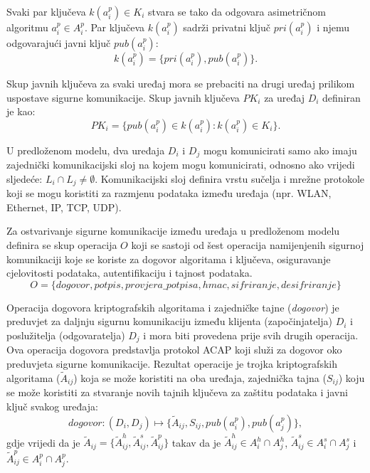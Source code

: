 Svaki par ključeva $k(a^p_i)\in K_i$ stvara se tako da odgovara asimetričnom
algoritmu $a^p_i\in A^p_i$. Par ključeva $k(a^p_i)$ 
sadrži privatni ključ $pri(a^p_i)$
i njemu odgovarajući javni ključ $pub(a^p_i)$:
\begin{equation}
    k(a^p_i)=\{pri(a^p_i), pub(a^p_i)\}.
\end{equation}

Skup javnih ključeva za svaki uređaj mora se prebaciti na drugi uređaj prilikom
uspostave sigurne komunikacije.
Skup javnih ključeva $PK_i$ za uređaj $D_i$ definiran je kao: 
\begin{equation}
PK_i=\{pub(a^p_i)\in k(a^p_i):k(a^p_i)\in K_i\}.
\end{equation}

U predloženom modelu, dva uređaja $D_i$ i $D_j$ mogu komunicirati samo
ako imaju zajednički komunikacijski sloj na kojem mogu komunicirati, odnosno ako
vrijedi sljedeće: $L_i \cap L_j \neq \emptyset$.
Komunikacijski sloj definira vrstu sučelja i mrežne protokole koji se mogu
koristiti za razmjenu podataka između uređaja (npr. WLAN, Ethernet, IP, TCP,
UDP). 


Za ostvarivanje sigurne komunikacije između uređaja u predloženom modelu
definira se skup operacija $O$ koji se sastoji od šest operacija namijenjenih
sigurnoj komunikaciji koje se koriste za dogovor algoritama i ključeva,
osiguravanje cjelovitosti podataka, autentifikaciju i tajnost podataka.
\begin{equation}
    O=\{dogovor, \mathit{potpis}, \mathit{provjera\_potpisa}, hmac, \mathit{sifriranje}, \mathit{desifriranje}\}
\end{equation}

Operacija dogovora kriptografskih algoritama i zajedničke tajne
(\textit{dogovor}) je preduvjet za daljnju sigurnu komunikaciju između
klijenta (započinjatelja) $D_i$ i poslužitelja (odgovaratelja) $D_j$ i mora biti
provedena prije svih drugih
operacija. Ova operacija dogovora predstavlja protokol ACAP koji služi za
dogovor oko preduvjeta sigurne komunikacije. Rezultat operacije je trojka
kriptografskih algoritama ($\widetilde{A}_{ij}$) koja se može koristiti na oba
uređaja, zajednička tajna ($S_{ij}$) koju se može koristiti za stvaranje novih
tajnih ključeva za zaštitu podataka i javni ključ svakog uređaja:
\begin{equation}
	dogovor:(D_i,D_j)\longmapsto\{\widetilde{A}_{ij},S_{ij},pub(a^p_i),pub(a^p_j)\},
	\label{eq:agreement}
\end{equation}
gdje vrijedi da je
$\widetilde{A}_{ij}=\{\widetilde{A}^h_{ij},\widetilde{A}^s_{ij},\widetilde{A}^p_{ij}\}$
takav da je $\widetilde{A}^h_{ij}\in A^h_{i}\cap A^h_{j}$,
$\widetilde{A}^s_{ij}\in A^s_{i}\cap A^s_{j}$ i $\widetilde{A}^p_{ij}\in
A^p_{i}\cap A^p_{j}$. 

